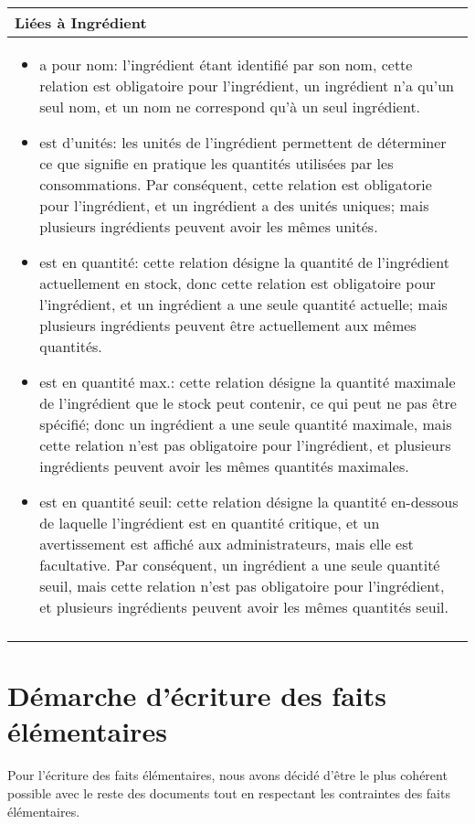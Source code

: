 \documentclass[a4paper,10pt]{article}
\begin{document}
\begin{tabu}{X}
\textbf{Liées à Ingrédient}\\
\toprule

\begin{itemize}
    \item a pour nom: l'ingrédient étant identifié par son nom, cette relation est obligatoire pour l'ingrédient, un ingrédient n'a qu'un seul nom, et un nom ne correspond qu'à un seul ingrédient.
    \item est d'unités: les unités de l'ingrédient permettent de déterminer ce que signifie en pratique les quantités utilisées par les consommations. Par conséquent, cette relation est obligatorie pour l'ingrédient, et un ingrédient a des unités uniques; mais plusieurs ingrédients peuvent avoir les mêmes unités.
    \item est en quantité: cette relation désigne la quantité de l'ingrédient actuellement en stock, donc cette relation est obligatoire pour l'ingrédient, et un ingrédient a une seule quantité actuelle; mais plusieurs ingrédients peuvent être actuellement aux mêmes quantités.
    \item est en quantité max.: cette relation désigne la quantité maximale de l'ingrédient que le stock peut contenir, ce qui peut ne pas être spécifié; donc un ingrédient a une seule quantité maximale, mais cette relation n'est pas obligatoire pour l'ingrédient, et plusieurs ingrédients peuvent avoir les mêmes quantités maximales.
    \item est en quantité seuil: cette relation désigne la quantité en-dessous de laquelle l'ingrédient est en quantité critique, et un avertissement est affiché aux administrateurs, mais elle est facultative. Par conséquent, un ingrédient a une seule quantité seuil, mais cette relation n'est pas obligatoire pour l'ingrédient, et plusieurs ingrédients peuvent avoir les mêmes quantités seuil.
\end{itemize}
\\\\
\end{tabu}

\section{Démarche d'écriture des faits élémentaires}

Pour l'écriture des faits élémentaires, nous avons décidé d'être le plus cohérent possible avec le reste des documents tout en respectant les contraintes des faits élémentaires.
\end{document}
